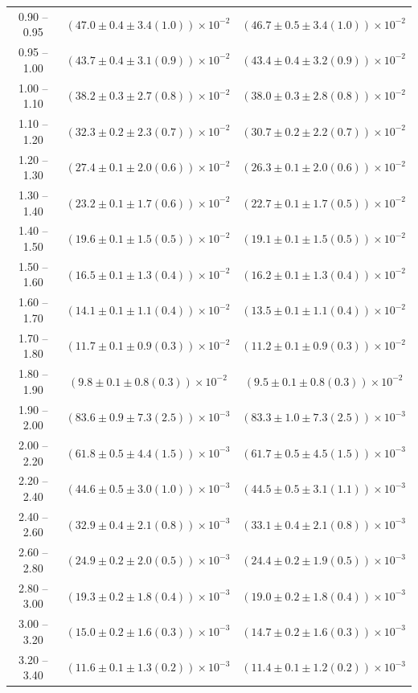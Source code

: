 \begin{table}
\begin{center}
\begin{tabular}{ c | c c }
0.90 -- 0.95 & $(47.0\pm0.4\pm3.4(1.0))\times10^{-2}$ & $(46.7\pm0.5\pm3.4(1.0))\times10^{-2}$ \\ 
0.95 -- 1.00 & $(43.7\pm0.4\pm3.1(0.9))\times10^{-2}$ & $(43.4\pm0.4\pm3.2(0.9))\times10^{-2}$ \\ 
1.00 -- 1.10 & $(38.2\pm0.3\pm2.7(0.8))\times10^{-2}$ & $(38.0\pm0.3\pm2.8(0.8))\times10^{-2}$ \\ 
1.10 -- 1.20 & $(32.3\pm0.2\pm2.3(0.7))\times10^{-2}$ & $(30.7\pm0.2\pm2.2(0.7))\times10^{-2}$ \\ 
1.20 -- 1.30 & $(27.4\pm0.1\pm2.0(0.6))\times10^{-2}$ & $(26.3\pm0.1\pm2.0(0.6))\times10^{-2}$ \\ 
1.30 -- 1.40 & $(23.2\pm0.1\pm1.7(0.6))\times10^{-2}$ & $(22.7\pm0.1\pm1.7(0.5))\times10^{-2}$ \\ 
1.40 -- 1.50 & $(19.6\pm0.1\pm1.5(0.5))\times10^{-2}$ & $(19.1\pm0.1\pm1.5(0.5))\times10^{-2}$ \\ 
1.50 -- 1.60 & $(16.5\pm0.1\pm1.3(0.4))\times10^{-2}$ & $(16.2\pm0.1\pm1.3(0.4))\times10^{-2}$ \\ 
1.60 -- 1.70 & $(14.1\pm0.1\pm1.1(0.4))\times10^{-2}$ & $(13.5\pm0.1\pm1.1(0.4))\times10^{-2}$ \\ 
1.70 -- 1.80 & $(11.7\pm0.1\pm0.9(0.3))\times10^{-2}$ & $(11.2\pm0.1\pm0.9(0.3))\times10^{-2}$ \\ 
1.80 -- 1.90 & $(9.8\pm0.1\pm0.8(0.3))\times10^{-2}$ & $(9.5\pm0.1\pm0.8(0.3))\times10^{-2}$ \\ 
1.90 -- 2.00 & $(83.6\pm0.9\pm7.3(2.5))\times10^{-3}$ & $(83.3\pm1.0\pm7.3(2.5))\times10^{-3}$ \\ 
2.00 -- 2.20 & $(61.8\pm0.5\pm4.4(1.5))\times10^{-3}$ & $(61.7\pm0.5\pm4.5(1.5))\times10^{-3}$ \\ 
2.20 -- 2.40 & $(44.6\pm0.5\pm3.0(1.0))\times10^{-3}$ & $(44.5\pm0.5\pm3.1(1.1))\times10^{-3}$ \\ 
2.40 -- 2.60 & $(32.9\pm0.4\pm2.1(0.8))\times10^{-3}$ & $(33.1\pm0.4\pm2.1(0.8))\times10^{-3}$ \\ 
2.60 -- 2.80 & $(24.9\pm0.2\pm2.0(0.5))\times10^{-3}$ & $(24.4\pm0.2\pm1.9(0.5))\times10^{-3}$ \\ 
2.80 -- 3.00 & $(19.3\pm0.2\pm1.8(0.4))\times10^{-3}$ & $(19.0\pm0.2\pm1.8(0.4))\times10^{-3}$ \\ 
3.00 -- 3.20 & $(15.0\pm0.2\pm1.6(0.3))\times10^{-3}$ & $(14.7\pm0.2\pm1.6(0.3))\times10^{-3}$ \\ 
3.20 -- 3.40 & $(11.6\pm0.1\pm1.3(0.2))\times10^{-3}$ & $(11.4\pm0.1\pm1.2(0.2))\times10^{-3}$ \\ 

\end{tabular}
\end{center}
\end{table}
